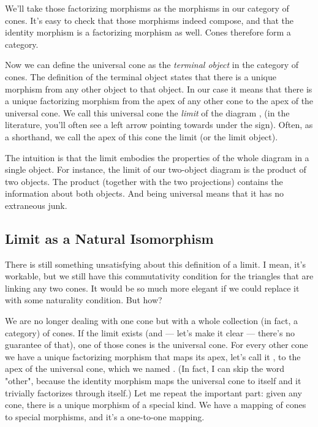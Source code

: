 We'll take those factorizing morphisms as the morphisms in our category
of cones. It's easy to check that those morphisms indeed compose, and
that the identity morphism is a factorizing morphism as well. Cones
therefore form a category.

Now we can define the universal cone as the \emph{terminal object} in
the category of cones. The definition of the terminal object states that
there is a unique morphism from any other object to that object. In our
case it means that there is a unique factorizing morphism from the apex
of any other cone to the apex of the universal cone. We call this
universal cone the \emph{limit} of the diagram ,  (in
the literature, you'll often see a left arrow pointing towards 
under the  sign). Often, as a shorthand, we call the apex of
this cone the limit (or the limit object).

The intuition is that the limit embodies the properties of the whole
diagram in a single object. For instance, the limit of our two-object
diagram is the product of two objects. The product (together with the
two projections) contains the information about both objects. And being
universal means that it has no extraneous junk.

\subsection{Limit as a Natural Isomorphism}\label{limit-as-a-natural-isomorphism}

There is still something unsatisfying about this definition of a limit.
I mean, it's workable, but we still have this commutativity condition
for the triangles that are linking any two cones. It would be so much
more elegant if we could replace it with some naturality condition. But
how?

We are no longer dealing with one cone but with a whole collection (in
fact, a category) of cones. If the limit exists (and --- let's make it
clear --- there's no guarantee of that), one of those cones is the
universal cone. For every other cone we have a unique factorizing
morphism that maps its apex, let's call it , to the apex of
the universal cone, which we named . (In fact, I can skip
the word "other", because the identity morphism maps the universal
cone to itself and it trivially factorizes through itself.) Let me
repeat the important part: given any cone, there is a unique morphism of
a special kind. We have a mapping of cones to special morphisms, and
it's a one-to-one mapping.

